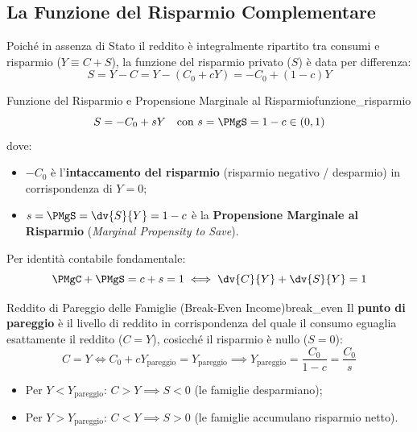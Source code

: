 \subsection{La Funzione del Risparmio Complementare}

Poiché in assenza di Stato il reddito è integralmente ripartito tra consumi e risparmio ($Y \equiv C + S$), la funzione del risparmio privato ($S$) è data per differenza:
\begin{equation}
    S = Y - C = Y - (C_0 + cY) = -C_0 + (1 - c)Y
\end{equation}

\begin{definizione}{Funzione del Risparmio e Propensione Marginale al Risparmio}{funzione_risparmio}
\begin{equation}
    S = -C_0 + s Y \quad \text{con } s = \PMgS = 1 - c \in (0, 1)
\end{equation}
dove:
\begin{itemize}
    \item $-C_0$ è l'\textbf{intaccamento del risparmio} (risparmio negativo / desparmio) in corrispondenza di $Y = 0$;
    \item $s = \PMgS = \dv{S}{Y} = 1 - c$ è la \textbf{Propensione Marginale al Risparmio} (\textit{Marginal Propensity to Save}).
\end{itemize}
Per identità contabile fondamentale:
\begin{equation}
    \PMgC + \PMgS = c + s = 1 \iff \dv{C}{Y} + \dv{S}{Y} = 1
\end{equation}
\end{definizione}

\begin{definizione}{Reddito di Pareggio delle Famiglie (Break-Even Income)}{break_even}
Il \textbf{punto di pareggio} è il livello di reddito in corrispondenza del quale il consumo eguaglia esattamente il reddito ($C = Y$), cosicché il risparmio è nullo ($S = 0$):
\begin{equation}
    C = Y \iff C_0 + c Y_{\text{pareggio}} = Y_{\text{pareggio}} \implies Y_{\text{pareggio}} = \frac{C_0}{1 - c} = \frac{C_0}{s}
\end{equation}
\begin{itemize}
    \item Per $Y < Y_{\text{pareggio}}$: $C > Y \implies S < 0$ (le famiglie desparmiano);
    \item Per $Y > Y_{\text{pareggio}}$: $C < Y \implies S > 0$ (le famiglie accumulano risparmio netto).
\end{itemize}
\end{definizione}

